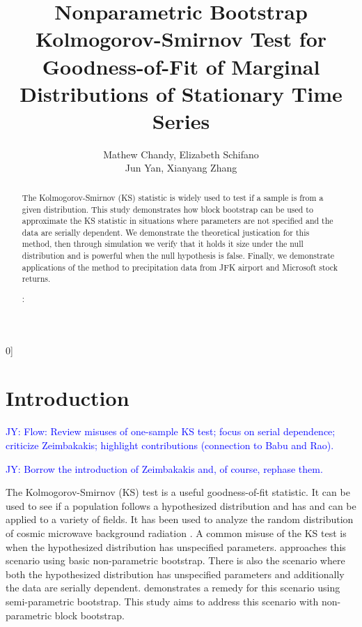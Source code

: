 \documentclass[12pt, letterpaper]{article}
\newcommand{\jy}[1]{\textcolor{blue}{JY: #1}}
\newcommand{\blind}{0]}
\begin{document}

\title{\bf Nonparametric Bootstrap Kolmogorov-Smirnov Test for
  Goodness-of-Fit of Marginal Distributions of Stationary Time Series}
\blind
{
  \author{Mathew Chandy, %
  Elizabeth Schifano\\
  Jun Yan, %
  Xianyang Zhang\\
}
} \fi


\maketitle


\begin{abstract}

The Kolmogorov-Smirnov (KS) statistic is widely used to test if a sample is
from a given distribution. This study demonstrates how block bootstrap can be 
used to approximate the KS statistic in situations where parameters are 
not specified and the data are serially dependent. We demonstrate the 
theoretical justication for this method, then through simulation we verify that
it holds it size under the null distribution and is powerful when the null 
hypothesis is false. Finally, we demonstrate applications of the method to
precipitation data from JFK airport and Microsoft stock returns.

\bigskip
{}:
\end{abstract}

\doublespace 


\section{Introduction}
\label{sec:intro}


\jy{Flow:
  Review misuses of one-sample KS test; focus on serial dependence;
  criticize Zeimbakakis; highlight contributions (connection to Babu and Rao).}

\jy{Borrow the introduction of Zeimbakakis and, of course, rephase them.}

The Kolmogorov-Smirnov (KS) test is a useful goodness-of-fit statistic. It 
can be used to see if a population follows a hypothesized distribution and has 
and can be applied to a variety of fields. It has
been used to analyze the random distribution of cosmic microwave background 
radiation \citep{naess2012application}. A common misuse of the KS test is when
the hypothesized distribution has unspecified parameters. 
\citet{babu2004goodness} approaches this scenario using basic 
non-parametric bootstrap. There is also the scenario where both the hypothesized 
distribution has unspecified parameters and additionally the data are 
serially dependent. \citet{zeimbekakis2022misuses} demonstrates a remedy for
this scenario using semi-parametric bootstrap. This study aims to address this
scenario with non-parametric block bootstrap.
\end{document}
